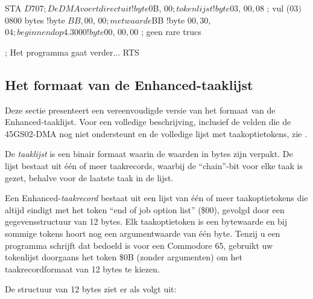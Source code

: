 \begin{asmcodesmall}
STA $D707  ; De DMA voert direct uit
!byte $0B, $00       ; tokenlijst
!byte $03, $00, $08  ; vul ($03) $0800 bytes
!byte $BB, $00, $00  ; met waarde $BB
!byte $00, $30, $04  ; beginnend op 4.3000
!byte $00, $00, $00  ; geen rare trucs

; Het programma gaat verder...
RTS
\end{asmcodesmall}

\subsection{Het formaat van de Enhanced-taaklijst}

Deze sectie presenteert een vereenvoudigde versie van het formaat van de Enhanced-taaklijst. Voor een volledige beschrijving, inclusief de velden die de 45GS02-DMA nog niet ondersteunt en de volledige lijst met taakoptietokens, zie .

De {\em taaklijst} is een binair formaat waarin de waarden in bytes zijn verpakt. De lijst bestaat uit één of meer taakrecords, waarbij de ``chain''-bit voor elke taak is gezet, behalve voor de laatste taak in de lijst.

Een Enhanced-{\em taakrecord} bestaat uit een lijst van één of meer taakoptietokens die altijd eindigt met het token ``end of job option list'' (\$00), gevolgd door een gegevensstructuur van 12 bytes. Elk taakoptietoken is een bytewaarde en bij sommige tokens hoort nog een argumentwaarde van één byte. Tenzij u een programma schrijft dat bedoeld is voor een Commodore 65, gebruikt uw tokenlijst doorgaans het token \$0B (zonder argumenten) om het taakrecordformaat van 12 bytes te kiezen.

De structuur van 12 bytes ziet er als volgt uit:

